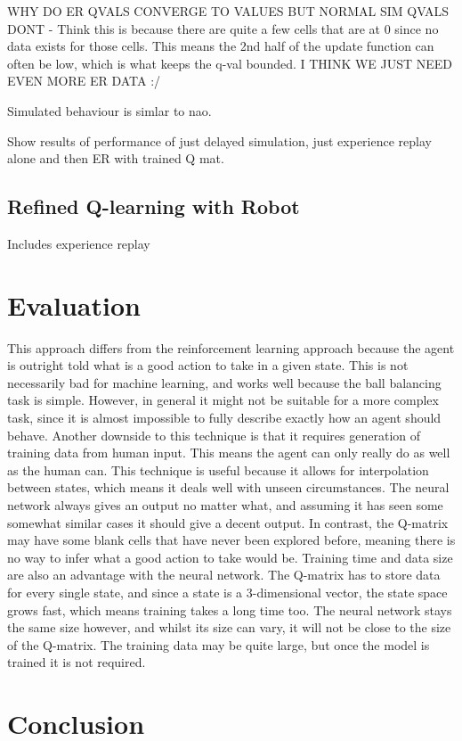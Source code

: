 \documentclass[12pt,a4paper]{article}
\begin{document}
WHY DO ER QVALS CONVERGE TO VALUES BUT NORMAL SIM QVALS DONT - Think this is because there are quite a few cells that are at 0 since no data exists for those cells. This means the 2nd half of the update function can often be low, which is what keeps the q-val bounded. I THINK WE JUST NEED EVEN MORE ER DATA :/



Simulated behaviour is simlar to nao. 

Show results of performance of just delayed simulation, just experience replay alone and then ER with trained Q mat.
\subsection{Refined Q-learning with Robot}
Includes experience replay
\section{Evaluation}
This approach differs from the reinforcement learning approach because the agent is outright told what is a good action to take in a given state. This is not necessarily bad for machine learning, and works well because the ball balancing task is simple. However, in general it might not be suitable for a more complex task, since it is almost impossible to fully describe exactly how an agent should behave. Another downside to this technique is that it requires generation of training data from human input. This means the agent can only really do as well as the human can. 
This technique is useful because it allows for interpolation between states, which means it deals well with unseen circumstances. The neural network always gives an output no matter what, and assuming it has seen some somewhat similar cases it should give a decent output. In contrast, the Q-matrix may have some blank cells that have never been explored before, meaning there is no way to infer what a good action to take would be. Training time and data size are also an advantage with the neural network. The Q-matrix has to store data for every single state, and since a state is a 3-dimensional vector, the state space grows fast, which means training takes a long time too. The neural network stays the same size however, and whilst its size can vary, it will not be close to the size of the Q-matrix. The training data may be quite large, but once the model is trained it is not required. 
\section{Conclusion}



\end{document}
